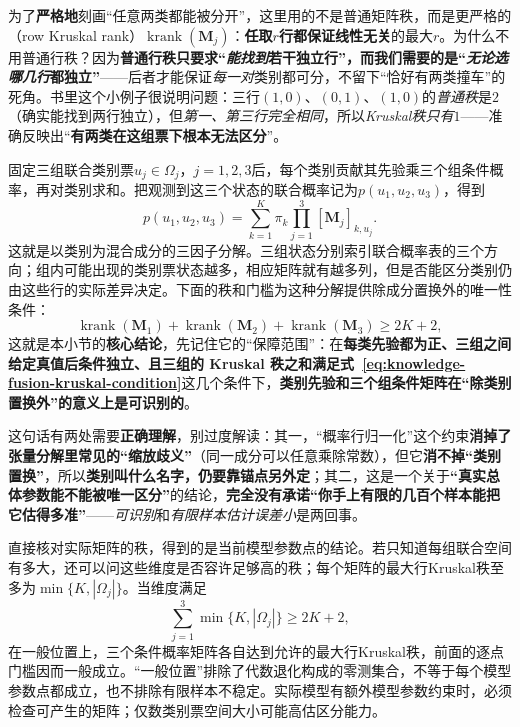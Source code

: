 为了\textbf{严格地}刻画“任意两类都能被分开”，这里用的不是普通矩阵秩，而是更严格的（row Kruskal rank）$\operatorname{krank}(\bm{M}_j)$：\textbf{任取$r$行都保证线性无关}的最大$r$。为什么不用普通行秩？因为\textbf{普通行秩只要求“\emph{能找到}若干独立行”，而我们需要的是“\emph{无论选哪几行}都独立”}——后者才能保证\emph{每一对}类别都可分，不留下“恰好有两类撞车”的死角。书里这个小例子很说明问题：三行$(1,0)$、$(0,1)$、$(1,0)$的\emph{普通秩}是$2$（确实能找到两行独立），但\emph{第一、第三行完全相同}，所以\emph{Kruskal秩只有$1$}——准确反映出“\textbf{有两类在这组票下根本无法区分}”。

固定三组联合类别票$u_j\in\Omega_j$，$j=1,2,3$后，每个类别贡献其先验乘三个组条件概率，再对类别求和。把观测到这三个状态的联合概率记为$p(u_1,u_2,u_3)$，得到
\[
  p(u_1,u_2,u_3)
  =\sum_{k=1}^{K}\pi_k
    \prod_{j=1}^{3}[\bm{M}_j]_{k,u_j}.
\]
这就是以类别为混合成分的三因子分解。三组状态分别索引联合概率表的三个方向；组内可能出现的类别票状态越多，相应矩阵就有越多列，但是否能区分类别仍由这些行的实际差异决定。下面的秩和门槛为这种分解提供除成分置换外的唯一性条件：
\begin{equation}
  \operatorname{krank}(\bm{M}_1)
  +\operatorname{krank}(\bm{M}_2)
  +\operatorname{krank}(\bm{M}_3)
  \geq 2K+2,
  \label{eq:knowledge-fusion-kruskal-condition}
\end{equation}
这就是本小节的\textbf{核心结论}，先记住它的“保障范围”：在\textbf{每类先验都为正、三组之间给定真值后条件独立、且三组的 Kruskal 秩之和满足式~\eqref{eq:knowledge-fusion-kruskal-condition}}这几个条件下，\textbf{类别先验和三个组条件矩阵在“除类别置换外”的意义上是可识别的}。

这句话有两处需要\textbf{正确理解}，别过度解读：其一，“概率行归一化”这个约束\textbf{消掉了张量分解里常见的“缩放歧义”}（同一成分可以任意乘除常数），但它\textbf{消不掉“类别置换”}，所以\textbf{类别叫什么名字，仍要靠锚点另外定}；其二，这是一个关于\textbf{“真实总体参数能不能被唯一区分”}的结论，\textbf{完全没有承诺“你手上有限的几百个样本能把它估得多准”}——\emph{可识别}和\emph{有限样本估计误差小}是两回事。

直接核对实际矩阵的秩，得到的是当前模型参数点的结论。若只知道每组联合空间有多大，还可以问这些维度是否容许足够高的秩；每个矩阵的最大行Kruskal秩至多为$\min\{K,|\Omega_j|\}$。当维度满足
\[
  \sum_{j=1}^{3}\min\{K,|\Omega_j|\}\geq2K+2,
\]
在一般位置上，三个条件概率矩阵各自达到允许的最大行Kruskal秩，前面的逐点门槛因而一般成立。“一般位置”排除了代数退化构成的零测集合，不等于每个模型参数点都成立，也不排除有限样本不稳定。实际模型有额外模型参数约束时，必须检查可产生的矩阵；仅数类别票空间大小可能高估区分能力。

